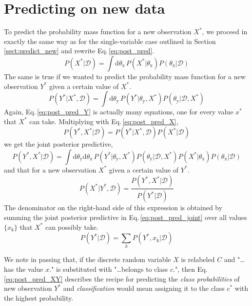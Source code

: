 \documentclass[]{report}
\begin{document}
\section{Predicting on new data}
To predict the probability mass function for a new observation $X^*$, we proceed in exactly the same way as for the single-variable case outlined in Section\,\ref{sect:predict_new} and rewrite Eq.\,\ref{eq:post_pred}.
\begin{equation} \label{eq:post_pred_X}
P(X^*|\mathcal{D}) = \int\mathrm{d}\theta_\mathrm{x}\,P(X^*|\theta_\mathrm{x})P(\theta_\mathrm{x}|\mathcal{D})
\end{equation}
The same is true if we wanted to predict the probability mass function for a new observation $Y^*$ given a certain value of $X^*$.
\begin{equation} \label{eq:post_pred_Y}
P(Y^*|X^*, \mathcal{D}) = \int\mathrm{d}\theta_\mathrm{y}\,P(Y^*|\theta_\mathrm{y}, X^*)P(\theta_\mathrm{y}|\mathcal{D}, X^*)
\end{equation}
Again, Eq.\,\ref{eq:post_pred_Y} is actually many equations, one for every value $x^*$ that $X^*$ can take. Multiplying with Eq.\,\ref{eq:post_pred_X},
\begin{equation}
P(Y^*, X^*|\mathcal{D}) = P(Y^*|X^*, \mathcal{D})P(X^*|\mathcal{D})
\end{equation}
we get the joint posterior predictive,
\begin{equation} \label{eq:post_pred_joint}
P(Y^*, X^*|\mathcal{D}) = \int\mathrm{d}\theta_\mathrm{y}\mathrm{d}\theta_\mathrm{x}\,P(Y^*|\theta_\mathrm{y}, X^*)P(\theta_\mathrm{y}|\mathcal{D}, X^*)P(X^*|\theta_\mathrm{x})P(\theta_\mathrm{x}|\mathcal{D})
\end{equation}
and that for a new observation $X^*$ given a certain value of $Y^*$.
\begin{equation} \label{eq:post_pred_XY}
P(X^*|Y^*, \mathcal{D}) = \frac{P(Y^*, X^*|\mathcal{D})}{P(Y^*|\mathcal{D})}
\end{equation}
The denominator on the right-hand side of this expression is obtained by summing the joint posterior predictive in Eq.\,\ref{eq:post_pred_joint} over all values $\{x_\mathrm{k}\}$ that $X^*$ can possibly take.
\begin{equation}
P(Y^*|\mathcal{D}) = \sum_{k}P(Y^*, x_\mathrm{k}|\mathcal{D})
\end{equation}

We note in passing that, if the discrete random variable $X$ is relabeled $C$ and "\ldots has the value $x$." is substituted with "\ldots belongs to class $c$.", then Eq.\,\ref{eq:post_pred_XY} describes the recipe for predicting the \emph{class probabilities} of new observation $Y^*$ and \emph{classification} would mean assigning it to the class $c^*$ with the highest probability.
\end{document}
